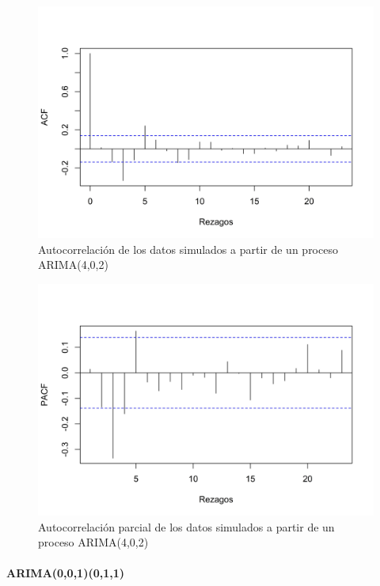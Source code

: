 \documentclass[
]{article}
\begin{document}
\begin{figure}[H]
\includegraphics[width=1\linewidth,height=1\textheight]{Tesis_files/figure-latex/arima402_acf-1} \caption{Autocorrelación de los datos simulados a partir de un proceso ARIMA(4,0,2)}\label{fig:arima402_acf}
\end{figure}

\begin{figure}[H]
\includegraphics[width=1\linewidth,height=1\textheight]{Tesis_files/figure-latex/arima402_pacf-1} \caption{Autocorrelación parcial de los datos simulados a partir de un proceso ARIMA(4,0,2)}\label{fig:arima402_pacf}
\end{figure}

\paragraph{ARIMA(0,0,1)(0,1,1)}
\end{document}
